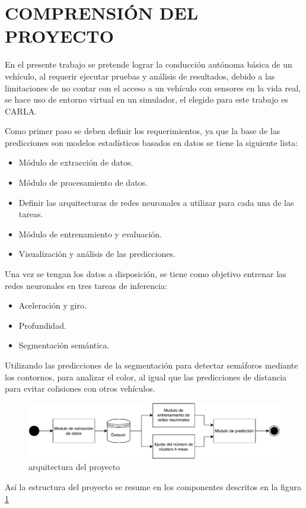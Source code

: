 \section{COMPRENSIÓN DEL PROYECTO}
En el presente trabajo se pretende lograr la conducción autónoma básica de un vehículo, al requerir ejecutar pruebas y análisis de resultados, debido a las limitaciones de no contar con el acceso a un vehículo con sensores en la vida real, se hace uso de entorno virtual en un simulador, el elegido para este trabajo es CARLA.

Como primer paso se deben definir los requerimientos, ya que la base de las predicciones son modelos estadísticos basados en datos se tiene la siguiente lista:

\begin{itemize}[nosep]
	\item Módulo de extracción de datos.
	\item Módulo de procesamiento de datos.
	\item Definir las arquitecturas de redes neuronales a utilizar para cada una de las tareas.
	\item Módulo de entrenamiento y evaluación.
	\item Visualización y análisis de las predicciones.
\end{itemize}

Una vez se tengan los datos a disposición, se tiene como objetivo entrenar las redes neuronales en tres tareas de inferencia:

\begin{itemize}[nosep]
	\item Aceleración y giro.
	\item Profundidad.
	\item Segmentación semántica.
\end{itemize}

Utilizando las predicciones de la segmentación para detectar semáforos mediante los contornos, para analizar el color, al igual que las predicciones de distancia para evitar colisiones con otros vehículos.

\begin{figure}[H]
	\centering
	\includegraphics[scale=0.75]{imagenes/arquitectura_proyecto}
	\caption[Arquitectura del proyecto]{arquitectura del proyecto}
	\label{arquitectura_proyecto}
\end{figure}

Así la estructura del proyecto se resume en los componentes descritos en la figura \ref{arquitectura_proyecto}